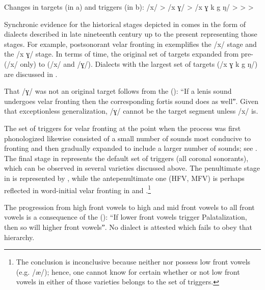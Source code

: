 \ea%
    \label{ex:4:38}
          Changes in targets (in a) and triggers (in b):
\ea \label{ex:4:38a} /x/  >  /x ɣ/  > /x ɣ k g ŋ/
\ex \label{ex:4:38b} >   >  > 
\z 
\z

Synchronic evidence for the historical stages depicted in  comes in the form of dialects described in late nineteenth century up to the present representing those stages. For example, postsonorant velar fronting in  exemplifies the /x/ stage and  the /x ɣ/ stage. In terms of time, the original set of targets expanded from pre- (/x/ only) to  (/x/ and /ɣ/). Dialects with the largest set of targets (/x ɣ k g ŋ/) are discussed in .

That /ɣ/ was not an original target follows from the  (): “If a lenis sound undergoes velar fronting then the corresponding fortis sound does as wellˮ. Given that exceptionless generalization, /ɣ/ cannot be the target segment unless /x/ is.

The set of triggers for velar fronting at the point when the process was first phonologized likewise consisted of a small number of sounds most conducive to fronting and then gradually expanded to include a larger number of sounds; see . The final stage in  represents the default set of triggers (all coronal sonorants), which can be observed in several varieties discussed above. The penultimate stage in  is represented by , while the antepenultimate one (HFV, MFV) is perhaps reflected in word-initial velar fronting in  and .\footnote{{The conclusion is inconclusive because neither  nor  possess low front vowels (e.g. /æ/); hence, one cannot know for certain whether or not low front vowels in either of those varieties belongs to the set of triggers.}}

The progression from high front vowels to high and mid front vowels to all front vowels is a consequence of the  (): “If lower front vowels trigger Palatalization, then so will higher front vowelsˮ. No dialect is attested which fails to obey that hierarchy.

